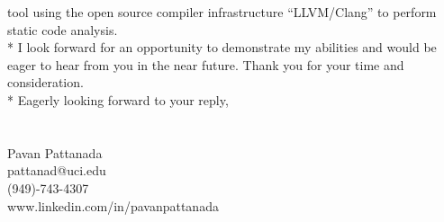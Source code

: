 \documentclass{cover}
\begin{document}
tool using the open source compiler infrastructure “LLVM/Clang” to perform
static code analysis. \vspace{0.2in}\\*
I look forward for an opportunity to demonstrate my abilities and would be
eager to
hear from you in the near future. Thank you for your time and consideration.\\*
Eagerly looking forward to your reply,\\ \\\\
Pavan Pattanada\\
pattanad@uci.edu\\
(949)-743-4307\\
www.linkedin.com/in/pavanpattanada\\
 
\end{document}
